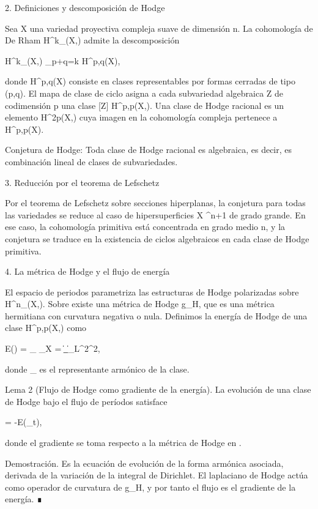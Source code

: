 \documentclass[12pt,a4paper]{book}
\begin{document}
2. Definiciones y descomposición de Hodge

Sea X una variedad proyectiva compleja suave de dimensión n. La cohomología de De Rham H^k_{}(X,) admite la descomposición

H^k_{}(X,) \cong \bigoplus_{p+q=k} H^{p,q}(X),

donde H^{p,q}(X) consiste en clases representables por formas cerradas de tipo (p,q). El mapa de clase de ciclo asigna a cada subvariedad algebraica Z de codimensión p una clase [Z] \in H^{p,p}(X,). Una clase de Hodge racional es un elemento \alpha \in H^{2p}(X,) cuya imagen en la cohomología compleja pertenece a H^{p,p}(X).

Conjetura de Hodge: Toda clase de Hodge racional es algebraica, es decir, es combinación lineal de clases de subvariedades.

3. Reducción por el teorema de Lefschetz

Por el teorema de Lefschetz sobre secciones hiperplanas, la conjetura para todas las variedades se reduce al caso de hipersuperficies X \subset {}^{n+1} de grado grande. En ese caso, la cohomología primitiva está concentrada en grado medio n, y la conjetura se traduce en la existencia de ciclos algebraicos en cada clase de Hodge primitiva.

4. La métrica de Hodge y el flujo de energía

El espacio de periodos  parametriza las estructuras de Hodge polarizadas sobre H^n_{}(X,). Sobre  existe una métrica de Hodge g_H, que es una métrica hermitiana con curvatura negativa o nula. Definimos la energía de Hodge de una clase \alpha \in H^{p,p}(X,) como

E(\alpha) = \inf_{\omega \in \alpha} \int_X \omega \wedge * \omega = \|\omega_{}\|_{L^2}^2,

donde \omega_{} es el representante armónico de la clase.

Lema 2 (Flujo de Hodge como gradiente de la energía). La evolución de una clase de Hodge bajo el flujo de períodos satisface

 = -\nabla E(\alpha_t),

donde el gradiente se toma respecto a la métrica de Hodge en .

Demostración. Es la ecuación de evolución de la forma armónica asociada, derivada de la variación de la integral de Dirichlet. El laplaciano de Hodge actúa como operador de curvatura de g_H, y por tanto el flujo es el gradiente de la energía. ∎
\end{document}
